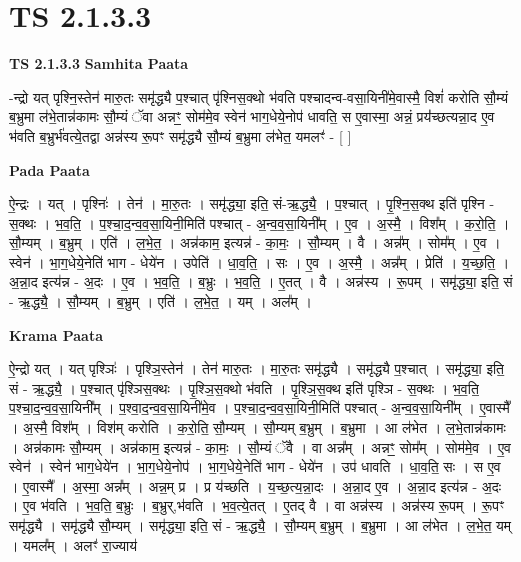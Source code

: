 \documentclass[17pt]{extarticle}
\begin{document}
\section*{ TS 2.1.3.3 }

\textbf{TS 2.1.3.3 } \newline
\textbf{Samhita Paata} \newline

-न्द्रो यत् पृश्नि॒स्तेन॑ मारु॒तः समृ॑द्ध्यै प॒श्चात् पृ॑श्निस॒क्थो भ॑वति पश्चादन्व-वसा॒यिनी॑मे॒वास्मै॒ विशं॑ करोति सौ॒म्यं ब॒भ्रुमा ल॑भे॒तान्न॑कामः सौ॒म्यं ॅवा अन्नꣳ॒॒ सोम॑मे॒व स्वेन॑ भाग॒धेये॒नोप॑ धावति॒ स ए॒वास्मा॒ अन्नं॒ प्रय॑॑च्छत्यन्ना॒द ए॒व भ॑वति ब॒भ्रुर्भ॑वत्ये॒तद्वा अन्न॑स्य रू॒पꣳ समृ॑द्ध्यै सौ॒म्यं ब॒भ्रुमा ल॑भेत॒ यमलꣳ॑ - [  ] \newline

\textbf{Pada Paata} \newline

ऐ॒न्द्रः । यत् । पृश्निः॑ । तेन॑ । मा॒रु॒तः । समृ॑द्ध्या॒ इति॒ सं-ऋ॒द्ध्यै॒ । प॒श्चात् । पृ॒श्नि॒स॒क्थ इति॑ पृश्नि - स॒क्थः । भ॒व॒ति॒ । प॒श्चा॒द॒न्व॒व॒सा॒यिनी॒मिति॑ पश्चात् - अ॒न्व॒व॒सा॒यिनी᳚म् । ए॒व । अ॒स्मै॒ । विश᳚म् । क॒रो॒ति॒ । सौ॒म्यम् । ब॒भ्रुम् । एति॑ । ल॒भे॒त॒ । अन्न॑काम॒ इत्यन्न॑ - का॒मः॒ । सौ॒म्यम् । वै । अन्न᳚म् । सोम᳚म् । ए॒व । स्वेन॑ । भा॒ग॒धेये॒नेति॑ भाग - धेये॑न । उपेति॑ । धा॒व॒ति॒ । सः । ए॒व । अ॒स्मै॒ । अन्न᳚म् । प्रेति॑ । य॒च्छ॒ति॒ । अ॒न्ना॒द इत्य॑न्न - अ॒दः । ए॒व । भ॒व॒ति॒ । ब॒भ्रुः । भ॒व॒ति॒ । ए॒तत् । वै । अन्न॑स्य । रू॒पम् । समृ॑द्ध्या॒ इति॒ सं - ऋ॒द्ध्यै॒ । सौ॒म्यम् । ब॒भ्रुम् । एति॑ । ल॒भे॒त॒ । यम् । अल᳚म् ।  \newline


\textbf{Krama Paata} \newline

ऐ॒न्द्रो यत् । यत् पृश्ञिः॑ । पृश्ञि॒स्तेन॑ । तेन॑ मारु॒तः । मा॒रु॒तः समृ॑द्ध्यै । समृ॑द्ध्यै प॒श्चात् । समृ॑द्ध्या॒ इति॒ सं - ऋ॒द्ध्यै॒ । प॒श्चात् पृ॑श्ञिस॒क्थः । पृ॒श्ञि॒स॒क्थो भ॑वति । पृ॒श्ञि॒स॒क्थ इति॑ पृश्ञि - स॒क्थः । भ॒व॒ति॒ प॒श्चा॒द॒न्व॒व॒सा॒यिनी᳚म् । प॒श्वा॒द॒न्व॒व॒सा॒यिनी॑मे॒व । प॒श्चा॒द॒न्व॒व॒सा॒यिनी॒मिति॑ पश्चात् - अ॒न्व॒व॒सा॒यिनी᳚म् । ए॒वास्मै᳚ । अ॒स्मै॒ विश᳚म् । विश॑म् करोति । क॒रो॒ति॒ सौ॒म्यम् । सौ॒म्यम् ब॒भ्रुम् । ब॒भ्रुमा । आ ल॑भेत । ल॒भे॒तान्न॑कामः । अन्न॑कामः सौ॒म्यम् । अन्न॑काम॒ इत्यन्न॑ - का॒मः॒ । सौ॒म्यं ॅवै । वा अन्न᳚म् । अन्नꣳ॒॒ सोम᳚म् । सोम॑मे॒व । ए॒व स्वेन॑ । स्वेन॑ भाग॒धेये॑न । भा॒ग॒धेये॒नोप॑ । भा॒ग॒धेये॒नेति॑ भाग - धेये॑न । उप॑ धावति । धा॒व॒ति॒ सः । स ए॒व । ए॒वास्मै᳚ । अ॒स्मा॒ अन्न᳚म् । अन्न॒म् प्र । प्र य॑च्छति । य॒च्छ॒त्य॒न्ना॒दः । अ॒न्ना॒द ए॒व । अ॒न्ना॒द इत्य॑न्न - अ॒दः । ए॒व भ॑वति । भ॒व॒ति॒ ब॒भ्रुः । ब॒भ्रुर्,भ॑वति । भ॒व॒त्ये॒तत् । ए॒तद् वै । वा अन्न॑स्य । अन्न॑स्य रू॒पम् । रू॒पꣳ समृ॑द्ध्यै । समृ॑द्ध्यै सौ॒म्यम् । समृ॑द्ध्या॒ इति॒ सं - ऋ॒द्ध्यै॒ । सौ॒म्यम् ब॒भ्रुम् । ब॒भ्रुमा । आ ल॑भेत । ल॒भे॒त॒ यम् । यमल᳚म् । अलꣳ॑ रा॒ज्याय॑ \newline
\end{document}
